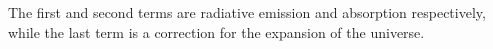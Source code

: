 \documentclass[manuscript]{aastex}
\begin{document}
The first and second terms are radiative emission and absorption respectively, while the last term is a correction for the expansion of the universe. 


\end{document}
